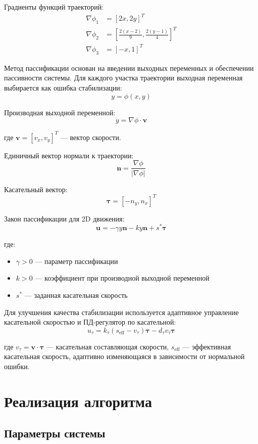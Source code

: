 \documentclass[a4paper,14pt,oneside,openany]{memoir}
\begin{document}
Градиенты функций траекторий:
\begin{align}
\nabla\phi_1 &= [2x, 2y]^T \\
\nabla\phi_2 &= \left[\frac{2(x-2)}{9}, \frac{2(y-1)}{4}\right]^T \\
\nabla\phi_3 &= [-x, 1]^T
\end{align}

Метод пассификации основан на введении выходных переменных и обеспечении пассивности системы. Для каждого участка траектории выходная переменная выбирается как ошибка стабилизации:
$$y = \phi(x, y)$$

Производная выходной переменной:
$$\dot{y} = \nabla\phi \cdot \mathbf{v}$$

где $\mathbf{v} = [v_x, v_y]^T$ --- вектор скорости.

Единичный вектор нормали к траектории:
$$\mathbf{n} = \frac{\nabla\phi}{|\nabla\phi|}$$

Касательный вектор:
$$\boldsymbol{\tau} = [-n_y, n_x]^T$$

Закон пассификации для 2D движения:
$$\mathbf{u} = -\gamma y\mathbf{n} - k\dot{y}\mathbf{n} + s^*\boldsymbol{\tau}$$

где:
\begin{itemize}
\item $\gamma > 0$ --- параметр пассификации
\item $k > 0$ --- коэффициент при производной выходной переменной
\item $s^*$ --- заданная касательная скорость
\end{itemize}

Для улучшения качества стабилизации используется адаптивное управление касательной скоростью и ПД-регулятор по касательной:
$$u_\tau = k_\tau(s_{\text{eff}} - v_\tau)\boldsymbol{\tau} - d_\tau v_\tau\boldsymbol{\tau}$$

где $v_\tau = \mathbf{v} \cdot \boldsymbol{\tau}$ --- касательная составляющая скорости, $s_{\text{eff}}$ --- эффективная касательная скорость, адаптивно изменяющаяся в зависимости от нормальной ошибки.

\section{Реализация алгоритма}

\subsection{Параметры системы}
\end{document}
